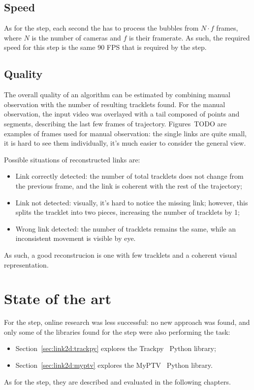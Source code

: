 \subsection{Speed}

As for the \locate* step, each second the \linkDD* has to process the bubbles from $N{\cdot}f$ frames, where $N$ is the number of cameras and $f$ is their framerate.
As such, the required speed for this step is the same 90 FPS that is required by the \locate* step.

\subsection{Quality}

The overall quality of an algorithm can be estimated by combining manual observation with the number of resulting tracklets found.
For the manual observation, the input video was overlayed with a tail composed of points and segments, describing the last few frames of trajectory.
Figures~TODO are examples of frames used for manual observation: the single links are quite small, it is hard to see them individually, it's much easier to consider the general view.

Possible situations of reconstructed links are:
\begin{itemize}
	\itemsep 0em
	\item Link correctly detected: the number of total tracklets does not change from the previous frame, and the link is coherent with the rest of the trajectory;
	\item Link not detected: visually, it's hard to notice the missing link; however, this splits the tracklet into two pieces, increasing the number of tracklets by 1;
	\item Wrong link detected: the number of tracklets remains the same, while an inconsistent movement is visible by eye.
\end{itemize}
As such, a good reconstrucion is one with few tracklets and a coherent visual representation.

\section{State of the art}

For the \link* step, online research was less successful: no new approach was found, and only some of the libraries found for the \locate* step were also performing the task:
\begin{itemize}
	\itemsep 0em
	\item Section~\ref{sec:link2d:trackpy} explores the Trackpy~\cite{trackpy} Python library;
	\item Section~\ref{sec:link2d:myptv} explores the MyPTV~\cite{myptv} Python library.
\end{itemize}
As for the \link* step, they are described and evaluated in the following chapters.

